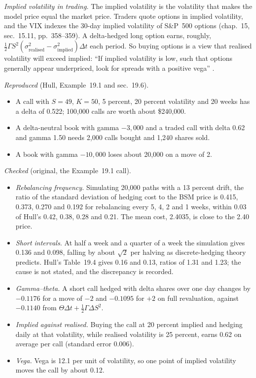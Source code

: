 \begin{qfmethod}
\emph{Implied volatility in trading.} The implied volatility is the volatility that makes the model price equal the market price. Traders quote options in implied volatility, and the VIX indexes the 30-day implied volatility of S\&P~500 options (chap.~15, sec.~15.11, pp.~358--359). A delta-hedged long option earns, roughly, $\tfrac12\Gamma S^2(\sigma_{\text{realised}}^2-\sigma_{\text{implied}}^2)\Delta t$ each period. So buying options is a view that realised volatility will exceed implied: ``If implied volatility is low, such that options generally appear underpriced, look for spreads with a positive vega'' \citep[chap.~11, p.~199]{s7-natenberg}.

 \emph{Reproduced} (Hull, Example~19.1 and sec.~19.6).
\begin{itemize}
\item A call with $S=49$, $K=50$, 5 percent, 20 percent volatility and 20 weeks has a delta of 0.522; 100{,}000 calls are worth about \$240{,}000.
\item A delta-neutral book with gamma $-3{,}000$ and a traded call with delta 0.62 and gamma 1.50 needs 2{,}000 calls bought and 1{,}240 shares sold.
\item A book with gamma $-10{,}000$ loses about 20{,}000 on a move of 2.
\end{itemize}

\emph{Checked} (original, the Example~19.1 call).
\begin{itemize}
\item \emph{Rebalancing frequency.} Simulating 20{,}000 paths with a 13 percent drift, the ratio of the standard deviation of hedging cost to the BSM price is 0.415, 0.373, 0.270 and 0.192 for rebalancing every 5, 4, 2 and 1 weeks, within 0.03 of Hull's 0.42, 0.38, 0.28 and 0.21. The mean cost, 2.4035, is close to the 2.40 price.
\item \emph{Short intervals.} At half a week and a quarter of a week the simulation gives 0.136 and 0.098, falling by about $\sqrt2$ per halving as discrete-hedging theory predicts. Hull's Table~19.4 gives 0.16 and 0.13, ratios of 1.31 and 1.23; the cause is not stated, and the discrepancy is recorded.
\item \emph{Gamma--theta.} A short call hedged with delta shares over one day changes by $-0.1176$ for a move of $-2$ and $-0.1095$ for $+2$ on full revaluation, against $-0.1140$ from $\Theta\Delta t+\tfrac12\Gamma\Delta S^2$.
\item \emph{Implied against realised.} Buying the call at 20 percent implied and hedging daily at that volatility, while realised volatility is 25 percent, earns 0.62 on average per call (standard error 0.006).
\item \emph{Vega.} Vega is 12.1 per unit of volatility, so one point of implied volatility moves the call by about 0.12.
\end{itemize}


\end{qfmethod}
